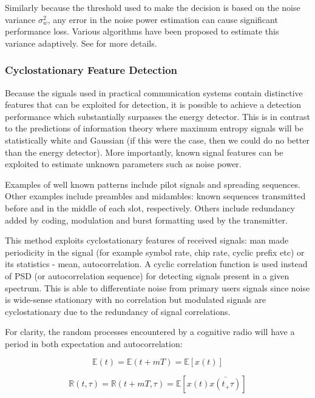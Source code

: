 \documentclass[conference]{IEEEtran}
\newcommand*\conjugate[1]{\bar{#1}}
\begin{document}
Similarly because the threshold used to make the decision is based on the noise variance \(\sigma_w^2\), any error in the noise power estimation can cause significant performance loss. Various algorithms have been proposed to estimate this variance adaptively. See \cite{Yucek2009} for more details.

\subsubsection{Cyclostationary Feature Detection}
Because the signals used in practical communication systems contain distinctive features that can be exploited for detection, it is possible to achieve a detection performance which substantially surpasses the energy detector. This is in contrast to the predictions of information theory where maximum entropy signals will be statistically white and Gaussian (if this were the case, then we could do no better than the energy detector). More importantly, known signal features can be exploited to estimate unknown parameters such as noise power. 

Examples of well known patterns include pilot signals and spreading sequences. Other examples include preambles and midambles: known sequences transmitted before and in the middle of each slot, respectively. Others include redundancy added by coding, modulation and burst formatting used by the transmitter. 

This method exploits cyclostationary features of received signals: man made periodicity in the signal (for example symbol rate, chip rate, cyclic prefix etc) or its statistics - mean, autocorrelation. A cyclic correlation function is used instead of PSD (or autocorrelation sequence) for detecting signals present in a given spectrum. This is able to differentiate noise from primary users signals since noise is wide-sense stationary with no correlation but modulated signals are cyclostationary due to the redundancy of signal correlations. 

For clarity, the random processes encountered by a cognitive radio will have a period in both expectation and autocorrelation:

\begin{equation}
\mathbb{E}\left(t\right) = \mathbb{E}\left(t + mT\right) = \mathbb{E}\left[x\left(t\right)\right]
\end{equation}

\begin{equation}
\mathbb{R}\left(t, \tau\right) = \mathbb{R}\left(t + mT, \tau\right) = \mathbb{E}\left[x\left(t\right)\conjugate{x\left(t_+\tau\right)}\right]
\end{equation}
\end{document}
